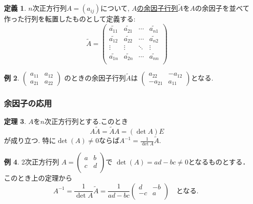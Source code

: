\documentclass[dvipdfmx,a4paper,11pt]{article}
\theoremstyle{definition}
\newtheorem{thm}{定理}
\newtheorem{dfn}[thm]{定義}
\newtheorem{exa}[thm]{例}
\begin{document}
  
\begin{tcolorbox}[
    colback = white,
    colframe = green!35!black,
    fonttitle = \bfseries,
    breakable = true]
    \begin{dfn}
    $n$次正方行列$A=(a_{ij})$について, 
     \underline{$A$の余因子行列$\widetilde{A}$}を$A$の余因子を並べて作った行列を転置したものとして定義する:
    $$
\widetilde{A}
=
\begin{pmatrix}
\widetilde{a_{11}}& \widetilde{a_{21}}& \cdots &\widetilde{a_{n1}} \\
\widetilde{a_{12}}& \widetilde{a_{22}} & \cdots &\widetilde{a_{n2}} \\
\vdots& \vdots	&	\ddots   &	\vdots \\
\widetilde{a_{1n}}& \widetilde{a_{2n}} & \cdots &\widetilde{a_{nn}} \\
\end{pmatrix}
$$
     \end{dfn}
 \end{tcolorbox}
\begin{exa}
\label{inverse_2}
$
\begin{pmatrix}
a_{11} & a_{12} \\
a_{21} & a_{22}
\end{pmatrix}
$
のときの余因子行列$\widetilde{A}$は
$\begin{pmatrix}
a_{22} &- a_{12} \\
-a_{21} & a_{11}
\end{pmatrix}$となる.
\end{exa}

\subsubsection{余因子の応用}

\begin{tcolorbox}[
    colback = white,
    colframe = green!35!black,
    fonttitle = \bfseries,
    breakable = true]
    \begin{thm}
 $A$を$n$次正方行列とする.このとき
$$A\widetilde{A} = \widetilde{A}A =(\det A)E$$
が成り立つ. 
特に$\det(A)\neq0$ならば$A^{-1} = \frac{1}{\det A} \widetilde{A}$.
     \end{thm}
 \end{tcolorbox}

\begin{exa}2次正方行列
 $A=
  \begin{pmatrix}
 a& b  \\
 c& d  \\
 \end{pmatrix} 
 $で
  $\det(A)=ad-bc \neq 0$となるものとする． 
  このとき上の定理から
 $$
 A^{-1} =   
 \frac{1}{\det A} \widetilde{A}
 =
 \frac{1}{ad-bc}
 \begin{pmatrix}
 d& -b  \\
 -c& a  \\
 \end{pmatrix} 
 \quad 
 \text{となる. }
 $$
\end{exa}
\end{document}
